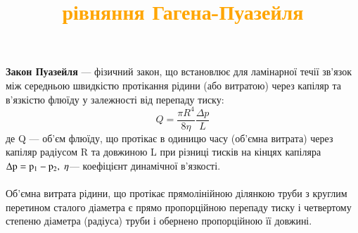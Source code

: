 \documentclass[aspectratio=169]{beamer}
\begin{document}
{
\title{\textcolor{orange}{рівняння Гагена-Пуазейля}}
\begin{frame}
\textbf{Закон Пуазейля} — фізичний закон, що встановлює для ламінарної течії зв'язок між середньою швидкістю протікання рідини (або витратою) через капіляр та в'язкістю флюїду у залежності від перепаду тиску:
\[Q=\frac{\pi R^4 }{8\eta} \frac{\Delta p}L\]
де Q — об'єм флюїду, що протікає в одиницю часу (об'ємна витрата) через капіляр радіусом R та довжиною L при різниці тисків на кінцях капіляра $\rm\Delta p=p_{1}-p_{2},$
$\rm\eta$— коефіцієнт динамічної в'язкості.\\
\center\ {\textcolor{black}{}}\\
Об'ємна витрата рідини, що протікає прямолінійною ділянкою труби з круглим перетином сталого діаметра є прямо пропорційною перепаду тиску і четвертому степеню діаметра (радіуса) труби і обернено пропорційною її довжині.
\end{frame}
}
\end{document}

